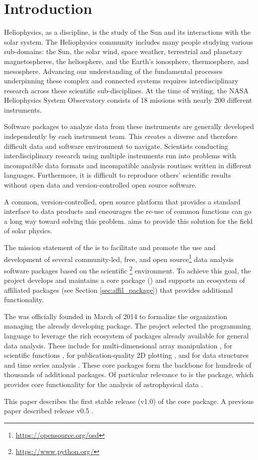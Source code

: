 \section{Introduction}
\label{sec:intro}

Heliophysics, as a discipline, is the study of the Sun and its interactions with the solar system.
The Heliophysics community includes many people studying various sub-domains: the Sun, the solar wind, space weather, terrestrial and planetary magnetospheres, the heliosphere, and the Earth's ionosphere, thermosphere, and mesosphere.
Advancing our understanding of the fundamental processes underpinning these complex and connected systems requires interdisciplinary research across these scientific sub-disciplines.
At the time of writing, the NASA Heliophysics System Observatory consists of 18 missions with nearly 200 different instruments.

Software packages to analyze data from these instruments are generally developed independently by each instrument team.
This creates a diverse and therefore difficult data and software environment to navigate.
Scientists conducting interdisciplinary research using multiple instruments run into problems with incompatible data formats and incompatible analysis routines written in different languages.
Furthermore, it is difficult to reproduce others' scientific results without open data and version-controlled open source software.

A common, version-controlled, open source platform that provides a standard interface to data products and encourages the re-use of common functions can go a long way toward solving this problem.
\sunpyproj aims to provide this solution for the field of solar physics.

The mission statement of the \sunpyproj is to facilitate and promote the use and development of several community-led, free, and open source\footnote{\url{https://opensource.org/osd}} data analysis software packages based on the scientific \python\footnote{\url{https://www.python.org/}} environment.
To achieve this goal, the project develops and maintains a core package (\sunpypkg) and supports an ecosystem of affiliated packages (see Section \ref{sec:affil_package}) that provides additional functionality.

The \sunpyproj was officially founded in March of 2014 to formalize the organization managing the already developing \sunpypkg package.
The project selected the \python programming language to leverage the rich ecosystem of packages already available for general data analysis.
These include \numpy for multi-dimensional array manipulation \citep{numpy}, \scipy for scientific functions \citep{scipy}, \matplotlib for publication-quality 2D plotting \citep{matplotlib}, and \pandas for data structures and time series analysis \citep{pandas}.
These core packages form the backbone for hundreds of thousands of additional \python packages.
Of particular relevance to \sunpypkg is the \astropypkg package, which provides core functionality for the analysis of astrophysical data \citep{astropy2018}.

This paper describes the first stable release (v1.0) of the core package.
A previous paper described release v0.5 \citep{Community:2015cy}.
